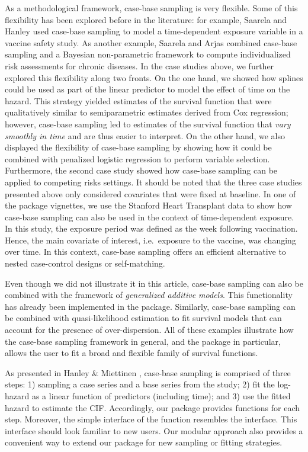 As a methodological framework, case-base sampling is very flexible. Some
of this flexibility has been explored before in the literature: for
example, Saarela and Hanley \citeyearpar{saarela2015case} used case-base
sampling to model a time-dependent exposure variable in a vaccine safety
study. As another example, Saarela and Arjas
\citeyearpar{saarela2015non} combined case-base sampling and a Bayesian
non-parametric framework to compute individualized risk assessments for
chronic diseases. In the case studies above, we further explored this
flexibility along two fronts. On the one hand, we showed how splines
could be used as part of the linear predictor to model the effect of
time on the hazard. This strategy yielded estimates of the survival
function that were qualitatively similar to semiparametric estimates
derived from Cox regression; however, case-base sampling led to
estimates of the survival function that \emph{vary smoothly in time} and
are thus easier to interpret. On the other hand, we also displayed the
flexibility of case-base sampling by showing how it could be combined
with penalized logistic regression to perform variable selection.
Furthermore, the second case study showed how case-base sampling can be
applied to competing risks settings. It should be noted that the three
case studies presented above only considered covariates that were fixed
at baseline. In one of the package vignettes, we use the Stanford Heart
Transplant data \citep[\citet{crowley1977covariance}]{clark1971cardiac}
to show how case-base sampling can also be used in the context of
time-dependent exposure. In this study, the exposure period was defined
as the week following vaccination. Hence, the main covariate of
interest, i.e.~exposure to the vaccine, was changing over time. In this
context, case-base sampling offers an efficient alternative to nested
case-control designs or self-matching.

Even though we did not illustrate it in this article, case-base sampling
can also be combined with the framework of \emph{generalized additive
models}. This functionality has already been implemented in the package.
Similarly, case-base sampling can be combined with quasi-likelihood
estimation to fit survival models that can account for the presence of
over-dispersion. All of these examples illustrate how the case-base
sampling framework in general, and the package  in
particular, allows the user to fit a broad and flexible family of
survival functions.

As presented in Hanley \& Miettinen \citeyearpar{hanley2009fitting},
case-base sampling is comprised of three steps: 1) sampling a case
series and a base series from the study; 2) fit the log-hazard as a
linear function of predictors (including time); and 3) use the fitted
hazard to estimate the CIF. Accordingly, our package provides functions
for each step. Moreover, the simple interface of the
 function resembles the  interface.
This interface should look familiar to new users. Our modular approach
also provides a convenient way to extend our package for new sampling or
fitting strategies.

